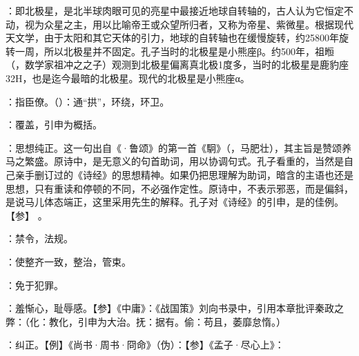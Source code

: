 {\item {}：即北极星，是北半球肉眼可见的亮星中最接近地球自转轴的，古人认为它恒定不动，视为众星之主，用以比喻帝王或众望所归者，又称为帝星、紫微星。根据现代天文学，由于太阳和其它天体的引力，地球的自转轴也在缓慢旋转，约25800年旋转一周，所以北极星并不固定。孔子当时的北极星是小熊座β。约500年，祖暅（，数学家祖冲之之子）观测到北极星偏离真北极1度多，当时的北极星是鹿豹座32H，也是迄今最暗的北极星。现代的北极星是小熊座α。

\item {}：指臣僚。（）：通“拱”，环绕，环卫。
}
{}


{
\item {}：覆盖，引申为概括。
\item {}：思想纯正。这一句出自《·鲁颂》的第一首《駉》（，马肥壮），其主旨是赞颂养马之繁盛。原诗中，是无意义的句首助词，用以协调句式。孔子看重的，当然是自己亲手删订过的《诗经》的思想精神。如果仍把思理解为助词，暗含的主语也还是思想，只有重读和停顿的不同，不必强作定性。原诗中，不表示邪恶，而是偏斜，是说马儿体态端正，这里采用先生的解释。孔子对《诗经》的引申，是的佳例。【参】 。
}
{}


{
\item {}：禁令，法规。
\item {}：使整齐一致，整治，管束。
\item {}：免于犯罪。
\item {}：羞惭心，耻辱感。【参】《中庸》：《战国策》刘向书录中，引用本章批评秦政之弊：（化：教化，引申为大治。抚：据有。偷：苟且，萎靡怠惰。）
\item {}：纠正。【例】《尚书·周书·冏命》（伪）：【参】《孟子·尽心上》：
}
{}  %


